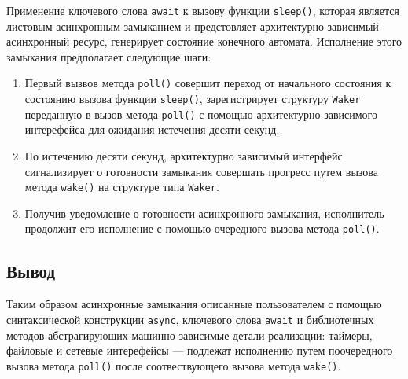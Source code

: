 Применение ключевого слова \verb|await| к вызову функции \verb|sleep()|, которая является листовым асинхронным замыканием и предстовляет архитектурно зависимый асинхронный ресурс, генерирует состояние конечного автомата. Исполнение этого замыкания предполагает следующие шаги:

\begin{enumerate}
    \item Первый вызвов метода \verb|poll()| совершит переход от начального состояния к состоянию вызова функции \verb|sleep()|, зарегистрирует структуру \verb|Waker| переданную в вызов метода \verb|poll()| с помощью архитектурно зависимого интерефейса для ожидания истечения десяти секунд.
    \item По истечению десяти секунд, архитектурно зависимый интерфейс сигнализирует о готовности замыкания совершать прогресс путем вызова метода \verb|wake()| на структуре типа \verb|Waker|.
    \item Получив уведомление о готовности асинхронного замыкания, исполнитель продолжит его исполнение с помощью очередного вызова метода \verb|poll()|.
\end{enumerate}

\subsection{Вывод}

Таким образом асинхронные замыкания описанные пользователем с помощью синтаксической конструкции \verb|async|, ключевого слова \verb|await| и библиотечных методов абстрагирующих машинно зависимые детали реализации: таймеры, файловые и сетевые интерефейсы --- подлежат исполнению путем поочередного вызова метода \verb|poll()| после соотвествующего вызова метода \verb|wake()|.
